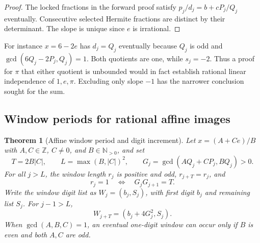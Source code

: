 \documentclass[11pt]{amsart}
\newtheorem{theorem}{Theorem}[section]
\theoremstyle{definition}
\theoremstyle{remark}
\numberwithin{equation}{section}
\newcommand{\Z}{\mathbb{Z}}
\newcommand{\N}{\mathbb{N}}
\begin{document}
\begin{proof}
The locked fractions in the forward proof satisfy
$p_j/d_j=b+cP_j/Q_j$ eventually. Consecutive selected Hermite
fractions are distinct by their determinant. The slope is unique
since $e$ is irrational.
\end{proof}
For instance $x=6-2e$ has $d_j=Q_j$ eventually because $Q_j$ is odd
and $\gcd(6Q_j-2P_j,Q_j)=1$. Both quotients are one, while $s_j=-2$.
Thus a proof for $\pi$ that either quotient is unbounded would in
fact establish rational linear independence of $1,e,\pi$. Excluding
only slope $-1$ has the narrower conclusion sought for the sum.

\subsection{Window periods for rational affine images}
\begin{theorem}[Affine window period and digit increment]\label{thm:affine-window}
Let $x=(A+C e)/B$ with $A,C\in\Z$, $C\ne0$, and $B\in\N_{>0}$,
and set
\[
 T=2B|C|,\qquad L=\max(B,|C|)^2,\qquad
 G_j=\gcd(AQ_j+C P_j,BQ_j)>0 .
\]
For all $j>L$, the window length $r_j$ is positive and odd,
$r_{j+T}=r_j$, and
\[
 r_j=1\quad\Longleftrightarrow\quad G_jG_{j+1}=T.
\]
Write the window digit list as $W_j=(b_j,S_j)$, with first digit
$b_j$ and remaining list $S_j$. For $j-1>L$,
\[
 W_{j+T}=(b_j+4G_j^2,S_j).
\]
When $\gcd(A,B,C)=1$, an eventual one-digit window can occur only
if $B$ is even and both $A,C$ are odd.
\end{theorem}
\end{document}

